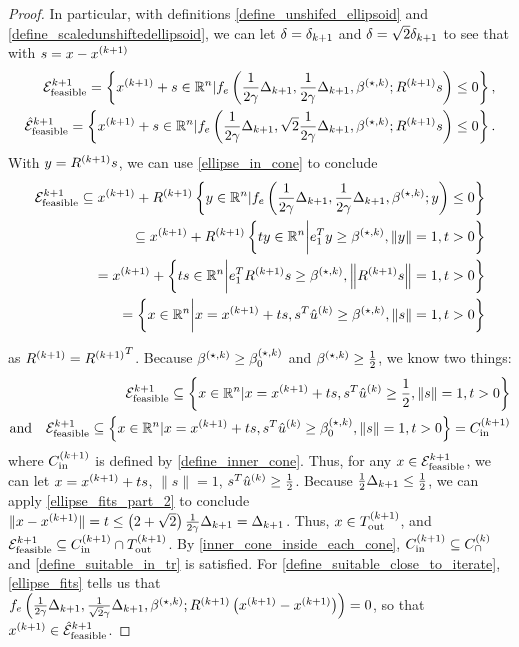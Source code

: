 \begin{proof}
In particular, with definitions \cref{define_unshifed_ellipsoid} and \cref{define_scaledunshiftedellipsoid},
we can let $\delta = {\delta_{k+1}}$ and $\delta = \sqrt{2}{\delta_{k+1}}$ to see that with $s = x - {{x}^{(k+1)}}$
\begin{align*}
{\mathcal E^{k+1}_{\textrm{feasible}}} = \left\{{{x}^{(k+1)}} + s \in \mathbb R^n | f_e\left(\frac 1 {2\gamma} \Delta_{k+1}, \frac 1 {2\gamma} \Delta_{k+1}, {\beta^{(\star, k)}}; {R^{(k+1)}} s \right) \le 0 \right\}, \\
{{\mathcal {\hat E}_{\text{feasible}}}^{k+1}} = \left\{{{x}^{(k+1)}} + s \in \mathbb R^n | f_e\left(\frac 1 {2\gamma} \Delta_{k+1}, \sqrt{2} \frac {1}{2\gamma}\Delta_{k+1}, {\beta^{(\star, k)}}; {R^{(k+1)}} s\right) \le 0 \right\}.
\end{align*}
With $y = {R^{(k+1)}} s$,  we can use \cref{ellipse_in_cone} to conclude
\begin{align*}
{\mathcal E^{k+1}_{\textrm{feasible}}}
\subseteq {{x}^{(k+1)}} + {R^{(k+1)}}\left\{y \in \mathbb R^n | f_e\left(\frac 1 {2\gamma} \Delta_{k+1}, \frac 1 {2\gamma} \Delta_{k+1}, {\beta^{(\star, k)}}; y \right) \le 0 \right\} \\
\subseteq  {{x}^{(k+1)}} + {R^{(k+1)}} \left\{t y \in \mathbb R^n \bigg| e_1^Ty \ge {\beta^{(\star, k)}}, \left\|y\right\| = 1, t > 0 \right\} \\
= {{x}^{(k+1)}} + \left\{t s \in \mathbb R^n \bigg| e_1^T{R^{(k+1)}} s \ge {\beta^{(\star, k)}}, \left\|{R^{(k+1)}} s\right\| = 1, t > 0 \right\} \\
= \left\{x  \in \mathbb R^n \bigg| x = {{x}^{(k+1)}} + ts, s^T{{\hat u}^{(k)}} \ge {\beta^{(\star, k)}}, \|s\| = 1, t > 0 \right\}
\end{align*}

as ${R^{(k+1)}} = {R^{(k+1)}}^T$.
Because ${\beta^{(\star, k)}} \ge {\beta_0^{(\star, k)}}$ and ${\beta^{(\star, k)}} \ge \frac 1 2$, we know two things:
\begin{align*}
{\mathcal E^{k+1}_{\textrm{feasible}}} \subseteq \left\{x \in \mathbb R^n | x = {{x}^{(k+1)}} + ts, s^T{{\hat u}^{(k)}} \ge \frac 1 2, \|s\|= 1, t > 0 \right\} \\
\textrm{and} \quad {\mathcal E^{k+1}_{\textrm{feasible}}} \subseteq \left\{x \in \mathbb R^n | x = {{x}^{(k+1)}} + ts, s^T{{\hat u}^{(k)}} \ge {\beta_0^{(\star, k)}}, \|s\|= 1, t > 0 \right\} = {C^{(k+1)}_{\textrm{in}}}
\end{align*}
where ${C^{(k+1)}_{\textrm{in}}}$ is defined by \cref{define_inner_cone}.
Thus, for any $x \in {\mathcal E^{k+1}_{\textrm{feasible}}}$, we can let $x = {{x}^{(k+1)}} + ts$, $\|s\| = 1$, $s^T{{\hat u}^{(k)}} \ge \frac 1 2$.
Because $\frac 1 2 \Delta_{k+1} \le \frac 1 2$, we can apply \cref{ellipse_fits_part_2} to conclude $\|x - {{x}^{(k+1)}}\| = t \le \left(2 + \sqrt{2}\right)\frac 1 {2\gamma} \Delta_{k+1} = \Delta_{k+1}$.
Thus, $x \in {T_{\text{out}}^{(k+1)}}$, and ${\mathcal E^{k+1}_{\textrm{feasible}}} \subseteq {C^{(k+1)}_{\textrm{in}}} \cap {T_{\text{out}}^{(k+1)}}$.
By \cref{inner_cone_inside_each_cone}, ${C^{(k+1)}_{\textrm{in}}} \subseteq {C^{(k)}_{\cap}}$ and \cref{define_suitable_in_tr} is satisfied.
For \cref{define_suitable_close_to_iterate}, \cref{ellipse_fits} tells us that
$f_e\left(\frac 1 {2\gamma} \Delta_{k+1}, \frac 1 {\sqrt{2}\gamma}\Delta_{k+1}, {\beta^{(\star, k)}}; {R^{(k+1)}}\left({{x}^{(k+1)}} - {{x}^{(k+1)}}\right)\right) = 0$, so that ${{x}^{(k+1)}} \in {{\mathcal {\hat E}_{\text{feasible}}}^{k+1}}$.
\end{proof}

